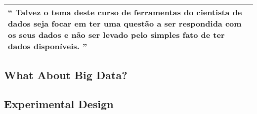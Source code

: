 \begin{center}
\begin{tabular}{p{15cm}}
\hline
{\large\textbf{``}}
Talvez o tema deste curso de ferramentas do cientista de dados seja focar em ter uma questão a ser respondida com os seus dados e não ser levado pelo simples fato de ter dados disponíveis.
{\large\textbf{''}}\\
\hline
\end{tabular}
\end{center}


\subsection{What About Big Data?}


\subsection{Experimental Design}

